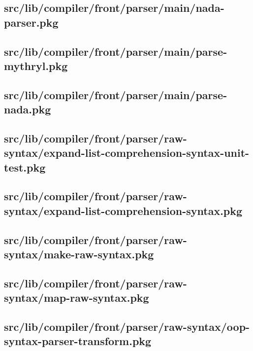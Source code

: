 \subsection{src/lib/compiler/front/parser/main/nada-parser.pkg}


\subsection{src/lib/compiler/front/parser/main/parse-mythryl.pkg}


\subsection{src/lib/compiler/front/parser/main/parse-nada.pkg}


\subsection{src/lib/compiler/front/parser/raw-syntax/expand-list-comprehension-syntax-unit-test.pkg}


\subsection{src/lib/compiler/front/parser/raw-syntax/expand-list-comprehension-syntax.pkg}


\subsection{src/lib/compiler/front/parser/raw-syntax/make-raw-syntax.pkg}


\subsection{src/lib/compiler/front/parser/raw-syntax/map-raw-syntax.pkg}


\subsection{src/lib/compiler/front/parser/raw-syntax/oop-syntax-parser-transform.pkg}


